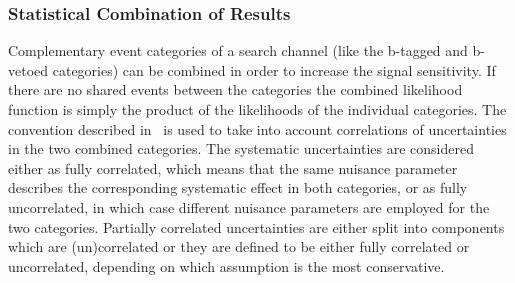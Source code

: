 \subsubsection{Statistical Combination of Results}
Complementary event categories of a search channel (like the b-tagged and b-vetoed categories) 
can be combined in order to increase the signal sensitivity.
If there are no shared events between the categories the combined likelihood function is simply the product
of the likelihoods of the individual categories. The  convention described in~\cite{lhclimits} is used
to take into account correlations of uncertainties in the two combined categories.
The systematic uncertainties are considered either as fully correlated, which means that the same nuisance parameter
describes the corresponding  systematic effect in both categories,  or as fully uncorrelated, in which case different nuisance parameters are
employed for the two categories. Partially correlated uncertainties are either split into components which are 
(un)correlated or they are defined  to be either fully correlated or uncorrelated, depending on which assumption is the most conservative.




